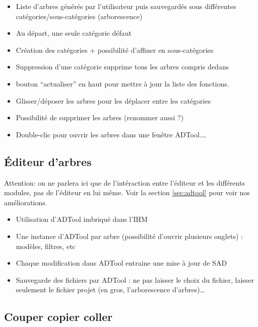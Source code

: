 		\begin{itemize}
			\item Liste d'arbres générés par l'utilisateur puis sauvegardés sous différentes catégories/sous-catégories (arborescence)
			\item Au départ, une seule catégorie défaut
			\item  Création des catégories + possibilité d'affiner en sous-catégories
			\item Suppression d'une catégorie supprime tous les arbres compris dedans
			\item bouton “actualiser” en haut pour mettre à jour la liste des fonctions.
			\item Glisser/déposer les arbres pour les déplacer entre les catégories
			\item Possibilité de supprimer les arbres (renommer aussi ?)
			\item Double-clic pour ouvrir les arbres dans une fenêtre ADTool.\ldots
		\end{itemize}
		
	\subsection{Éditeur d'arbres}

		Attention: on ne parlera ici que de l'intéraction entre l'éditeur et les différents modules, pas de l'éditeur en lui même.
		Voir la section \ref{sec:adtool} pour voir nos améliorations.

		\begin{itemize}
			\item  Utilisation d'ADTool imbriqué dans l'IHM
			\item Une instance d'ADTool par arbre (possibilité d'ouvrir plusieurs onglets) : modèles, filtres, etc
			\item Chaque modification dans ADTool entraine une mise à jour de SAD
			\item Sauvegarde des fichiers par ADTool : ne pas laisser le choix du fichier, laisser seulement le fichier projet (en gros, l'arborescence d'arbres)\ldots
		\end{itemize}


	\subsection{Couper copier coller}
	
